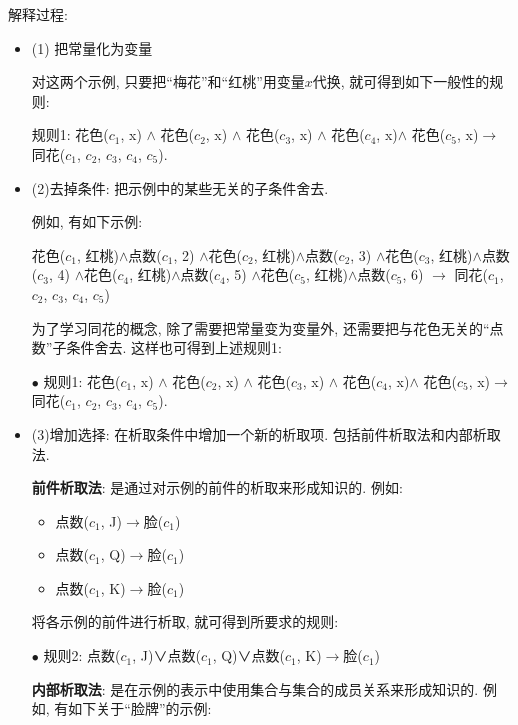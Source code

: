 解释过程:
\begin{itemize}
\item (1) 把常量化为变量
\begin{example}
对这两个示例, 只要把“梅花”和“红桃”用变量$x$代换, 就可得到如下一般性的规则:

    规则1: 花色($c_1$, x) $\wedge$ 花色($c_2$, x) $\wedge$ 花色($c_3$, x) $\wedge$ 花色($c_4$, x)$\wedge$ 花色($c_5$, x)$\rightarrow$ 同花($c_1$, $c_2$, $c_3$, $c_4$, $c_5$).
\end{example}

\item (2)去掉条件: 把示例中的某些无关的子条件舍去.

例如, 有如下示例:
\begin{example}
  花色($c_1$, 红桃)$\wedge$点数($c_1$, 2)
            $\wedge$花色($c_2$, 红桃)$\wedge$点数($c_2$, 3)
            $\wedge$花色($c_3$, 红桃)$\wedge$点数($c_3$, 4)
            $\wedge$花色($c_4$, 红桃)$\wedge$点数($c_4$, 5)
            $\wedge$花色($c_5$, 红桃)$\wedge$点数($c_5$, 6)
          $\rightarrow$ 同花($c_1$, $c_2$, $c_3$, $c_4$, $c_5$)
\end{example}

为了学习同花的概念, 除了需要把常量变为变量外, 还需要把与花色无关的“点数”子条件舍去. 这样也可得到上述规则1:

$\bullet$ 规则1: 花色($c_1$, x) $\wedge$ 花色($c_2$, x) $\wedge$ 花色($c_3$, x) $\wedge$ 花色($c_4$, x)$\wedge$ 花色($c_5$, x)$\rightarrow$ 同花($c_1$, $c_2$, $c_3$, $c_4$, $c_5$).

\item (3)增加选择: 在析取条件中增加一个新的析取项. 包括前件析取法和内部析取法.

\textbf{前件析取法}: 是通过对示例的前件的析取来形成知识的. 例如:
\begin{itemize}
\item 点数($c_1$, J)$\rightarrow$脸($c_1$)
\item 点数($c_1$, Q)$\rightarrow$脸($c_1$)
\item 点数($c_1$, K)$\rightarrow$脸($c_1$)
\end{itemize}

将各示例的前件进行析取, 就可得到所要求的规则:

 $\bullet$ 规则2: 点数($c_1$, J)∨点数($c_1$, Q)∨点数($c_1$, K)$\rightarrow$脸($c_1$)

\textbf{内部析取法}: 是在示例的表示中使用集合与集合的成员关系来形成知识的. 例如, 有如下关于“脸牌”的示例:


\end{itemize}

